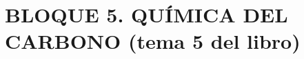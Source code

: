 \documentclass{article}
\begin{document}
%
%
%
%
%
%
%
%
%
%
\section{BLOQUE 5. QUÍMICA DEL CARBONO (tema 5 del libro)}
\end{document}
